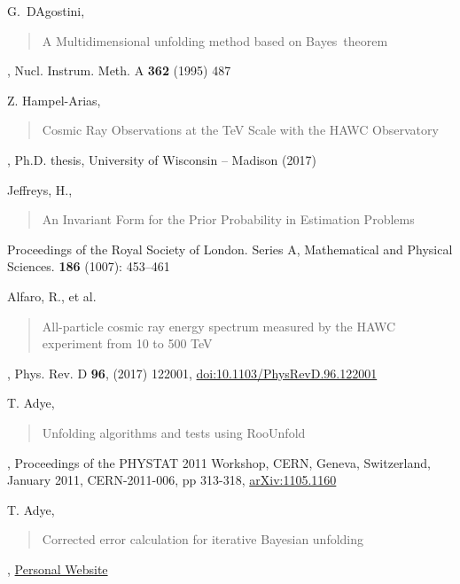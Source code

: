 \documentclass[11pt, letter]{article}
\begin{document}
\begin{thebibliography}{99}

 G.~D\textquotesingle Agostini, \blockquote{A Multidimensional unfolding method based on Bayes\textquotesingle \ theorem}, 
Nucl. Instrum. Meth. A {\bf 362} (1995) 487

 Z. Hampel-Arias, \blockquote{Cosmic Ray Observations at the TeV Scale with the HAWC Observatory},
Ph.D. thesis, University of Wisconsin -- Madison (2017)

 Jeffreys, H., \blockquote{An Invariant Form for the Prior Probability in Estimation Problems}. 
Proceedings of the Royal Society of London. Series A, Mathematical and Physical Sciences. {\bf 186} (1007): 453–461

 Alfaro, R., et al. \blockquote{All-particle cosmic ray energy spectrum measured by the HAWC experiment from 10 to 500 TeV}, 
Phys. Rev. D {\bf 96}, (2017) 122001, \href{https://journals.aps.org/prd/abstract/10.1103/PhysRevD.96.122001}{doi:10.1103/PhysRevD.96.122001}

 T. Adye, \blockquote{Unfolding algorithms and tests using RooUnfold}, Proceedings of the PHYSTAT 2011 Workshop, CERN, Geneva, 
Switzerland, January 2011, CERN-2011-006, pp 313-318, \href{http://arxiv.org/abs/1105.1160v1}{arXiv:1105.1160}

 T. Adye, \blockquote{Corrected error calculation for iterative Bayesian unfolding}, 
\href{http://hepunx.rl.ac.uk/~adye/software/unfold/bayes_errors.pdf}{Personal Website}

\end{thebibliography}
\end{document}

